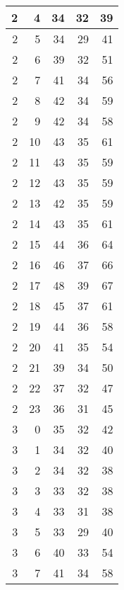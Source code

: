 \begin{longtable}{|r|r|r|r|r|}
    \hline
    2     & 4     & 34    & 32    & 39 \\
    \hline
    2     & 5     & 34    & 29    & 41 \\
    \hline
    2     & 6     & 39    & 32    & 51 \\
    \hline
    2     & 7     & 41    & 34    & 56 \\
    \hline
    2     & 8     & 42    & 34    & 59 \\
    \hline
    2     & 9     & 42    & 34    & 58 \\
    \hline
    2     & 10    & 43    & 35    & 61 \\
    \hline
    2     & 11    & 43    & 35    & 59 \\
    \hline
    2     & 12    & 43    & 35    & 59 \\
    \hline
    2     & 13    & 42    & 35    & 59 \\
    \hline
    2     & 14    & 43    & 35    & 61 \\
    \hline
    2     & 15    & 44    & 36    & 64 \\
    \hline
    2     & 16    & 46    & 37    & 66 \\
    \hline
    2     & 17    & 48    & 39    & 67 \\
    \hline
    2     & 18    & 45    & 37    & 61 \\
    \hline
    2     & 19    & 44    & 36    & 58 \\
    \hline
    2     & 20    & 41    & 35    & 54 \\
    \hline
    2     & 21    & 39    & 34    & 50 \\
    \hline
    2     & 22    & 37    & 32    & 47 \\
    \hline
    2     & 23    & 36    & 31    & 45 \\
    \hline
    3     & 0     & 35    & 32    & 42 \\
    \hline
    3     & 1     & 34    & 32    & 40 \\
    \hline
    3     & 2     & 34    & 32    & 38 \\
    \hline
    3     & 3     & 33    & 32    & 38 \\
    \hline
    3     & 4     & 33    & 31    & 38 \\
    \hline
    3     & 5     & 33    & 29    & 40 \\
    \hline
    3     & 6     & 40    & 33    & 54 \\
    \hline
    3     & 7     & 41    & 34    & 58 \\

\end{longtable}
